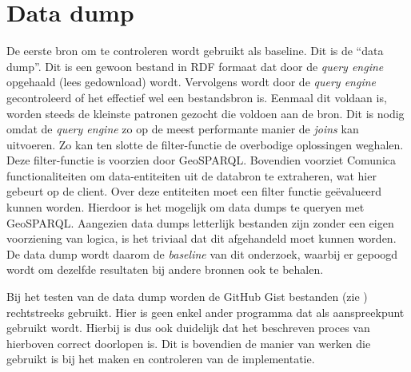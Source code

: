 \section{Data dump}
\label{sec:data-dump}
De eerste bron om te controleren wordt gebruikt als baseline. Dit is de ``data dump''. Dit is een gewoon bestand in RDF formaat dat door de \textit{query engine} opgehaald (lees gedownload) wordt. Vervolgens wordt door de \textit{query engine} gecontroleerd of het effectief wel een bestandsbron is. Eenmaal dit voldaan is, worden steeds de kleinste patronen gezocht die voldoen aan de bron. Dit is nodig omdat de \textit{query engine} zo op de meest performante manier de \textit{joins} kan uitvoeren. Zo kan ten slotte de filter-functie de overbodige oplossingen weghalen. Deze filter-functie is voorzien door GeoSPARQL. Bovendien voorziet Comunica functionaliteiten om data-entiteiten uit de databron te extraheren, wat hier gebeurt op de client. Over deze entiteiten moet een filter functie geëvalueerd kunnen worden. Hierdoor is het mogelijk om data dumps te queryen met GeoSPARQL. Aangezien data dumps letterlijk bestanden zijn zonder een eigen voorziening van logica, is het triviaal dat dit afgehandeld moet kunnen worden. De data dump wordt daarom de \textit{baseline} van dit onderzoek, waarbij er gepoogd wordt om dezelfde resultaten bij andere bronnen ook te behalen.

Bij het testen van de data dump worden de GitHub Gist bestanden (zie ) rechtstreeks gebruikt. Hier is geen enkel ander programma dat als aanspreekpunt gebruikt wordt. Hierbij is dus ook duidelijk dat het beschreven proces van hierboven correct doorlopen is. Dit is bovendien de manier van werken die gebruikt is bij het maken en controleren van de implementatie.